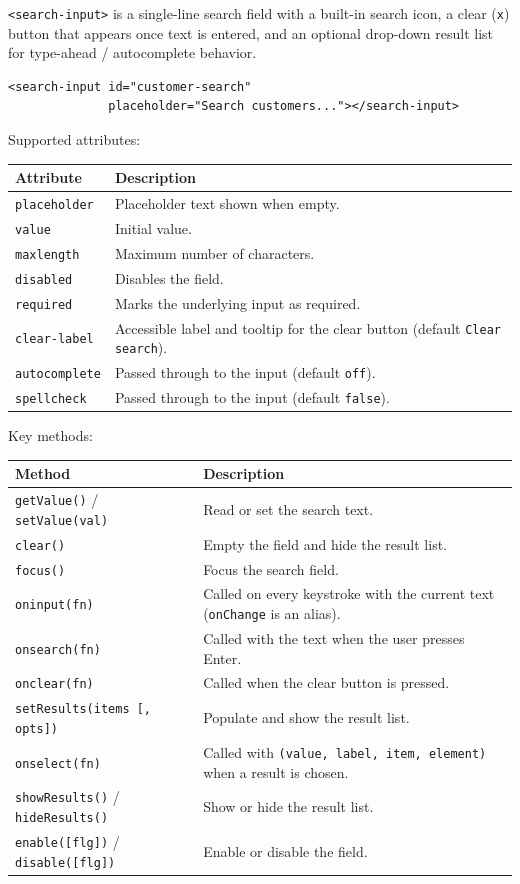 \texttt{<search-input>} is a single-line search field with a built-in search icon, a clear (\texttt{x}) button that appears once text is entered, and an optional drop-down result list for type-ahead / autocomplete behavior.

\begin{lstlisting}[style=html]
<search-input id="customer-search"
              placeholder="Search customers..."></search-input>
\end{lstlisting}

\noindent
Supported attributes:

\begin{longtable}{P{3.8cm}P{6.7cm}}
\toprule
\textbf{Attribute} & \textbf{Description} \\
\midrule
\endhead
\texttt{placeholder} & Placeholder text shown when empty. \\
\texttt{value} & Initial value. \\
\texttt{maxlength} & Maximum number of characters. \\
\texttt{disabled} & Disables the field. \\
\texttt{required} & Marks the underlying input as required. \\
\texttt{clear-label} & Accessible label and tooltip for the clear button (default \texttt{Clear search}). \\
\texttt{autocomplete} & Passed through to the input (default \texttt{off}). \\
\texttt{spellcheck} & Passed through to the input (default \texttt{false}). \\
\bottomrule
\end{longtable}

\noindent
Key methods:

\begin{longtable}{P{4.8cm}P{5.7cm}}
\toprule
\textbf{Method} & \textbf{Description} \\
\midrule
\endhead
\texttt{getValue()} / \texttt{setValue(val)} & Read or set the search text. \\
\texttt{clear()} & Empty the field and hide the result list. \\
\texttt{focus()} & Focus the search field. \\
\texttt{oninput(fn)} & Called on every keystroke with the current text (\texttt{onChange} is an alias). \\
\texttt{onsearch(fn)} & Called with the text when the user presses Enter. \\
\texttt{onclear(fn)} & Called when the clear button is pressed. \\
\texttt{setResults(items [, opts])} & Populate and show the result list. \\
\texttt{onselect(fn)} & Called with \texttt{(value, label, item, element)} when a result is chosen. \\
\texttt{showResults()} / \texttt{hideResults()} & Show or hide the result list. \\
\texttt{enable([flg])} / \texttt{disable([flg])} & Enable or disable the field. \\
\bottomrule
\end{longtable}

